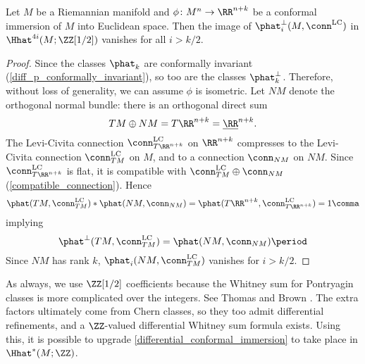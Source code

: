 \begin{thm}
\label{differential_conformal_immersion}
Let $M$ be a Riemannian manifold and $\phi \colon M^n\to \RR^{n+k}$ be a conformal immersion of $M$ into Euclidean
space. Then the image of $\phat^\perp_i(M, \conn^{\mathrm{LC}})$ in $\Hhat^{4i}(M;\ZZ[1/2])$ vanishes for all
$i>k/2$.
\end{thm}
\begin{proof}
Since the classes $\phat_k$ are conformally invariant (\cref{diff_p_conformally_invariant}), so too are the classes
$\phat_k^\perp$. Therefore, without loss of generality, we can assume $\phi$ is isometric. Let $NM$ denote the
orthogonal normal bundle: there is an orthogonal direct sum
	$$TM \oplus NM = T\RR^{n+k} = \underline{\RR}^{n+k}.$$
	The Levi-Civita connection $\conn_{T\RR^{n+k}}^{\mathrm{LC}}$ on $\RR^{n+k}$ compresses to the Levi-Civita
	connection $\conn_{TM}^{\mathrm{LC}}$ on $M$, and to a connection $\conn_{NM}$ on $NM$. Since
	$\conn_{T\RR^{n+k}}^{\mathrm{LC}}$ is flat, it is compatible with
	$\conn_{TM}^{\mathrm{LC}}\oplus\conn_{NM}$ (\cref{compatible_connection}). Hence
	\begin{equation}
		\phat(TM, \conn_{TM}^{\mathrm{LC}})*\phat(NM, \conn_{NM})= \phat(T\RR^{n+k},
		\conn_{T\RR^{n+k}}^{\mathrm{LC}}) = 1\comma
	\end{equation}
	implying
	\begin{equation}
		\phat^\perp(TM, \conn_{TM}^{\mathrm{LC}}) = \phat(NM, \conn_{NM})\period
	\end{equation}
	Since $NM$ has rank $k$, $\phat_i(NM, \conn_{TM}^{\mathrm{LC}})$ vanishes for $i > k/2$.
\end{proof}
\begin{remark}
As always, we use $\ZZ[1/2]$ coefficients because the Whitney sum for Pontryagin classes is more complicated over
the integers. See Thomas \cite{Tho62} and Brown \cite[Theorem 1.6]{Bro82}. The extra factors ultimately come from
Chern classes, so they too admit differential refinements, and a $\ZZ$-valued differential Whitney sum formula
exists. Using this, it is possible to upgrade \cref{differential_conformal_immersion} to take place in
$\Hhat^*(M;\ZZ)$.
\end{remark}

